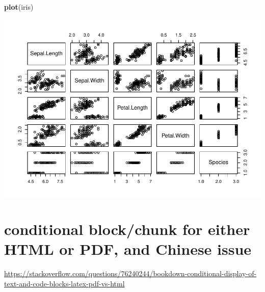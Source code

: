 \documentclass[
]{book}
\newenvironment{Shaded}{\begin{snugshade}}{\end{snugshade}}
\newcommand{\FunctionTok}[1]{\textcolor[rgb]{0.13,0.29,0.53}{\textbf{#1}}}
\newcommand{\NormalTok}[1]{#1}
\theoremstyle{definition}
\theoremstyle{definition}
\theoremstyle{definition}
\theoremstyle{definition}
\theoremstyle{remark}
\begin{document}
\begin{Shaded}
\begin{Highlighting}[]
\FunctionTok{plot}\NormalTok{(iris)}
\end{Highlighting}
\end{Shaded}

\includegraphics{202401280001-test_files/figure-latex/unnamed-chunk-41-1.pdf}

\section{conditional block/chunk for either HTML or PDF, and Chinese issue}\label{conditional-blockchunk-for-either-html-or-pdf-and-chinese-issue}

\url{https://stackoverflow.com/questions/76240244/bookdown-conditional-display-of-text-and-code-blocks-latex-pdf-vs-html}
\end{document}
